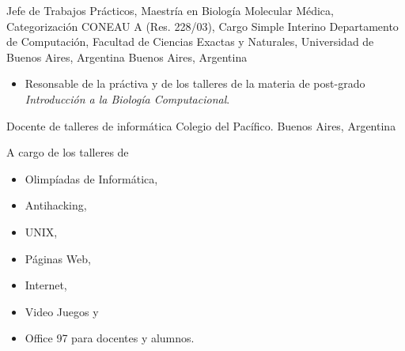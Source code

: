 	{Jefe de Trabajos Prácticos, Maestría en Biología Molecular Médica, Categorización CONEAU A (Res. 228/03), Cargo Simple Interino}
	{Departamento de Computación, Facultad de Ciencias Exactas y Naturales, Universidad de Buenos Aires, Argentina}
	{Buenos Aires, Argentina}
	{}
	{\begin{itemize}
	\item Resonsable de la práctiva y de los talleres de la materia de post-grado \emph{Introducción a la Biología Computacional}.
	\end{itemize}}
	{Docente de talleres de informática}
	{Colegio del Pacífico.}
	{Buenos Aires, Argentina}
	{}
	{A cargo de los talleres de \begin{itemize}
	\item Olimpíadas de Informática,
	\item Antihacking,
	\item UNIX,
	\item Páginas Web,
	\item Internet,
	\item Video Juegos y
	\item Office 97 para docentes y alumnos.
	\end{itemize}}


